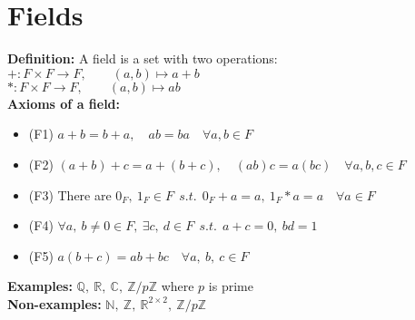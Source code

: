 \documentclass{article}
\begin{document}
    
    \section{Fields}

        \textbf{Definition: } A field is a set with two operations:\\

        $+: F \times F \longrightarrow F , \qquad (a , b) \longmapsto a + b$ \\
        
        $*: F \times F \longrightarrow F , \qquad (a , b) \longmapsto ab $ \\

        
        \textbf{Axioms of a field: }
        \begin{itemize}
            \item (F1) $ a + b = b + a, \quad ab = ba \quad \forall a , b \in F $
            \item (F2) $ (a + b) + c = a + (b + c) , \quad(ab)c = a(bc) \quad \forall a , b , c \in F $
            \item (F3) There are $0_F ,\: 1_F \in F \:\: s.t. \:\: 0_F + a = a,\: 1_F * a = a \quad \forall a \in F$
            \item (F4) $\forall a, \:b \neq 0 \in F, \: \exists c, \: d \in F \:\: s.t. \:\: a + c = 0, \: bd = 1$
            \item (F5) $a(b + c) = ab + bc \quad \forall a, \:b,\: c \in F$
        \end{itemize}

        \textbf{Examples: }
        $ \mathbb{Q},\: \mathbb{R},\: \mathbb{C} ,\: \mathbb{Z} / p\mathbb{Z}$ where $p$ is prime \\

        \textbf{Non-examples: }
        $ \mathbb{N},\: \mathbb{Z},\: \mathbb{R}^{2 \times 2} ,\: \mathbb{Z} / p\mathbb{Z}$
\end{document}
